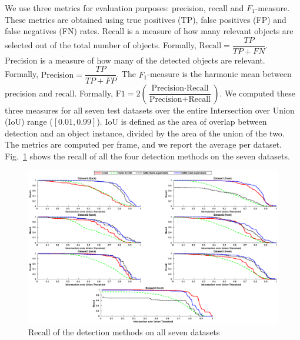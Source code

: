 We use three metrics for evaluation purposes: precision, recall and $F_1$-measure. These metrics are obtained using true positives (TP), false positives (FP) and false negatives (FN) rates. Recall is a measure of how many relevant objects are selected out of the total number of objects. Formally, $\text{Recall} = \dfrac{TP}{TP + FN}$. Precision is a measure of how many of the detected objects are relevant. Formally, $\text{Precision} = \dfrac{TP}{TP + FP}$.
The $F_1$-measure is the harmonic mean between precision and recall. Formally, $\text{F1} = 2 \left(\dfrac{\text{Precision} \cdot \text{Recall}}{\text{Precision} + \text{Recall}}\right)$.
We computed these three measures for all seven test datasets over the entire Intersection over Union (IoU) range ($[0.01,0.99]$). IoU is defined as the area of overlap between detection and an object instance, divided by the area of the union of the two. The metrics are computed per frame, and we report the average per dataset.
Fig.~\ref{fig:recall} shows the recall of all the four detection methods on the seven datasets. 

\begin{figure}[htbp!]
    \centering
    \includegraphics[width=\textwidth]{figures/detection/recall_with_semisup_gmm_.eps}
    \caption[Recall for the detection methods.]{Recall of the detection methods on all seven datasets}
    \label{fig:recall}
\end{figure}

